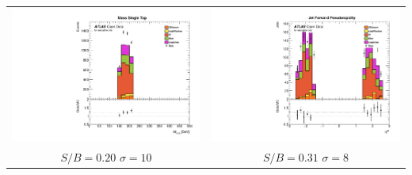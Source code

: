 \documentclass[10pt]{beamer}
\begin{document}
\begin{frame}
\begin{center}
	\begin{tabular}{cc}
		
		\includegraphics[scale=0.19]{SingleTopMasscarles} &
		
		\includegraphics[scale=0.19]{jet_leta} \\
		$S/B=0.20$ $\sigma=10$ & $S/B=0.31$ $\sigma=8$ \\
		

\end{tabular}
\end{center}
\end{frame}
\end{document}

